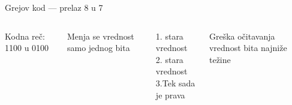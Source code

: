 \begin{frame}[label=06-s019]{Grejov kod — prelaz 8 u 7}
\fontsize{10}{12}\selectfont
\begin{columns}[c,onlytextwidth]
\centering
{}\centering
{}Kodna reč: 1100 u 0100\par\medskip
Menja se vrednost samo jednog bita\par\vspace{4mm}
1. stara vrednost\\2. stara vrednost\\3.\quad Tek sada je prava\par\vspace{4mm}
Greška očitavanja vrednost bita najniže težine
\end{columns}
\end{frame}
